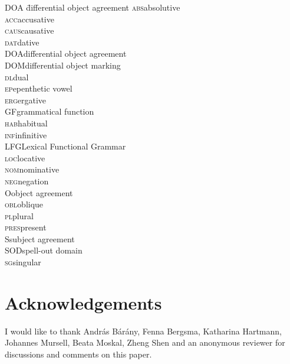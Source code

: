 \documentclass[output=paper
,modfonts
,nonflat]{langsci/langscibook}
\begin{document}
\begin{multicols}{2}
	\begin{tabbing}
		\textsc{DOA}\hspace{5mm} \= differential object agreement\kill
		\textsc{abs}\>absolutive\\
		\textsc{acc}\>accusative\\ 
		\textsc{caus}\>causative\\
		\textsc{dat}\>dative\\
		\textsc{DOA}\>differential object agreement\\
		\textsc{DOM}\>differential object marking\\
		\textsc{dl}\>dual\\
		\textsc{ep}\>epenthetic vowel\\
		\textsc{erg}\>ergative\\
		\textsc{GF}\>grammatical function\\
		\textsc{hab}\>habitual\\
		\textsc{inf}\>infinitive\\
		\textsc{LFG}\>Lexical Functional Grammar\\
		\textsc{loc}\>locative\\
		\textsc{nom}\>nominative\\
		\textsc{neg}\>negation\\
		O\>object agreement\\
		\textsc{obl}\>oblique\\
		\textsc{pl}\>plural\\
		\textsc{pres}\>present\\
		S\>subject agreement\\
		SOD\>spell-out domain\\
		\textsc{sg}\>singular\\
	\end{tabbing} 
\end{multicols}

\section*{Acknowledgements}

I would like to thank András Bárány, Fenna Bergsma, Katharina Hartmann, Johannes Mursell, Beata Moskal, Zheng Shen and an anonymous reviewer for discussions and comments on this paper.


{\sloppy
\printbibliography[heading=subbibliography,notkeyword=this]
}
\end{document}

